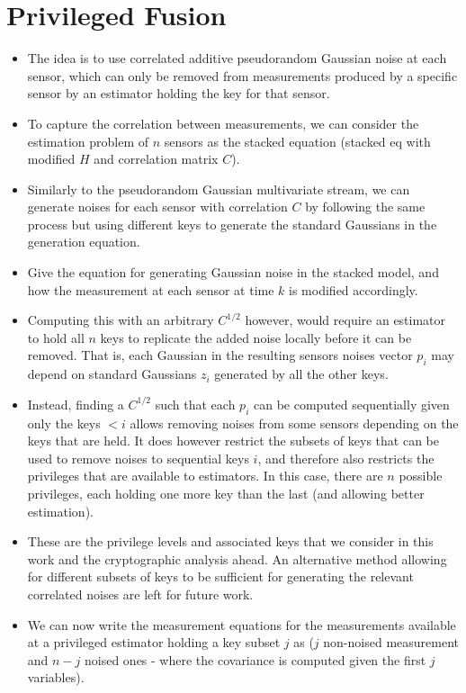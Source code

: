 \documentclass[conference]{IEEEtran}
\begin{document}
\section{Privileged Fusion}
\begin{itemize}
  \item The idea is to use correlated additive pseudorandom Gaussian noise at each sensor, which can only be removed from measurements produced by a specific sensor by an estimator holding the key for that sensor.
  \item To capture the correlation between measurements, we can consider the estimation problem of $n$ sensors as the stacked equation (stacked eq with modified $H$ and correlation matrix $C$).
  \item Similarly to the pseudorandom Gaussian multivariate stream, we can generate noises for each sensor with correlation $C$ by following the same process but using different keys to generate the standard Gaussians in the generation equation.
  \item Give the equation for generating Gaussian noise in the stacked model, and how the measurement at each sensor at time $k$ is modified accordingly.
  \item Computing this with an arbitrary $C^{1/2}$ however, would require an estimator to hold all $n$ keys to replicate the added noise locally before it can be removed. That is, each Gaussian in the resulting sensors noises vector $p_i$ may depend on standard Gaussians $z_i$ generated by all the other keys.
  \item Instead, finding a $C^{1/2}$ such that each $p_i$ can be computed sequentially given only the keys $<i$ allows removing noises from some sensors depending on the keys that are held. It does however restrict the subsets of keys that can be used to remove noises to sequential keys $i$, and therefore also restricts the privileges that are available to estimators. In this case, there are $n$ possible privileges, each holding one more key than the last (and allowing better estimation).
  \item These are the privilege levels and associated keys that we consider in this work and the cryptographic analysis ahead. An alternative method allowing for different subsets of keys to be sufficient for generating the relevant correlated noises are left for future work.
  \item We can now write the measurement equations for the measurements available at a privileged estimator holding a key subset $j$ as ($j$ non-noised measurement and $n-j$ noised ones - where the covariance is computed given the first $j$ variables).

\end{itemize}
\end{document}
